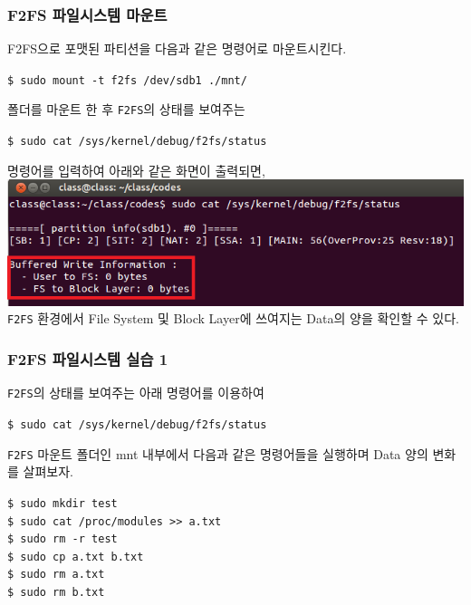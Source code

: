 \documentclass[newPxFont,sthlmFooter,nooffset]{beamer}
\begin{document}
\begin{frame}[containsverbatim,t]
  \frametitle{F2FS 파일시스템 마운트}
\begin{footnotesize}
F2FS으로 포맷된 파티션을 다음과 같은 명령어로 마운트시킨다.
\begin{mdframed}[backgroundcolor=lightgray,hidealllines=true]
\texttt{\textcolor[rgb]{0,0,0}{\$ sudo mount -t f2fs /dev/sdb1 ./mnt/}}
\end{mdframed}
\bigskip
폴더를 마운트 한 후 \texttt{F2FS}의 상태를 보여주는
\begin{mdframed}[backgroundcolor=lightgray,hidealllines=true]
\texttt{\textcolor[rgb]{0,0,0}{\$ sudo cat /sys/kernel/debug/f2fs/status}}
\end{mdframed}
\bigskip
명령어를 입력하여 아래와 같은 화면이 출력되면,\\
\medskip
\includegraphics[width=0.8\linewidth]{./figure/f2fsstatus.png}
\\
\texttt{F2FS} 환경에서 File System 및 Block Layer에 쓰여지는 Data의 양을 확인할 수 있다.
\end{footnotesize}
\end{frame}

\begin{frame}[containsverbatim,t]
  \frametitle{F2FS 파일시스템 실습 1}
\texttt{F2FS}의 상태를 보여주는 아래 명령어를 이용하여 
\begin{mdframed}[backgroundcolor=lightgray,hidealllines=true]
\texttt{\textcolor[rgb]{0,0,0}{\$ sudo cat /sys/kernel/debug/f2fs/status}}
\end{mdframed}
\bigskip
\texttt{F2FS} 마운트 폴더인 mnt 내부에서 다음과 같은 명령어들을 실행하며 Data 양의 변화를 살펴보자.
\begin{mdframed}[backgroundcolor=lightgray,hidealllines=true]
\texttt{\textcolor[rgb]{0,0,0}{\$ sudo mkdir test\\
\$ sudo cat /proc/modules >> a.txt\\
\$ sudo rm -r test\\
\$ sudo cp a.txt b.txt\\
\$ sudo rm a.txt\\
\$ sudo rm b.txt}}
\end{mdframed}
\end{frame}
\end{document}
